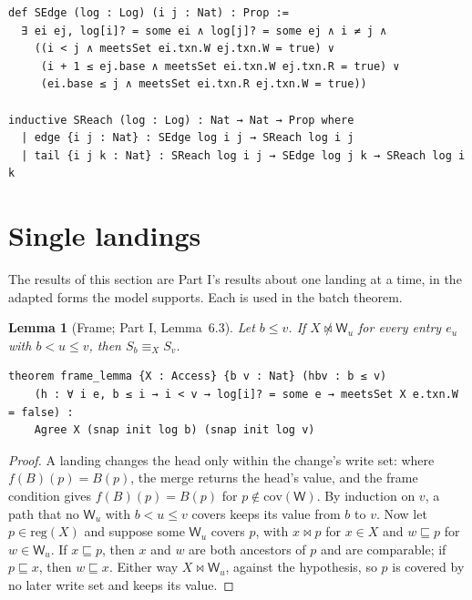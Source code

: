 \documentclass[11pt,letterpaper]{article}
\newtheorem{lemma}[theorem]{Lemma}
\theoremstyle{definition}
\theoremstyle{remark}
\newcommand{\W}{\mathsf{W}}
\newcommand{\Snap}[1]{S_{#1}}
\newcommand{\meets}{\bowtie}
\newcommand{\nmeets}{\not\bowtie}
\newcommand{\cov}{\sqsubseteq}
\newcommand{\op}[1]{\mathrm{#1}}
\newcommand{\covd}{\op{cov}}
\newcommand{\reg}{\op{reg}}
\begin{document}
\begin{lstlisting}[language=Lean,caption={The declared-access serialization graph (\texttt{YonedaTx/Graph.lean})},label={lst:mcbl:sedge}]
def SEdge (log : Log) (i j : Nat) : Prop :=
  ∃ ei ej, log[i]? = some ei ∧ log[j]? = some ej ∧ i ≠ j ∧
    ((i < j ∧ meetsSet ei.txn.W ej.txn.W = true) ∨
     (i + 1 ≤ ej.base ∧ meetsSet ei.txn.W ej.txn.R = true) ∨
     (ei.base ≤ j ∧ meetsSet ei.txn.R ej.txn.W = true))

inductive SReach (log : Log) : Nat → Nat → Prop where
  | edge {i j : Nat} : SEdge log i j → SReach log i j
  | tail {i j k : Nat} : SReach log i j → SEdge log j k → SReach log i k
\end{lstlisting}

\section{Single landings}
\label{sec:mcbl:single}

The results of this section are Part I's results about one landing at a time, in the adapted forms the model supports. Each is used in the batch theorem.

\begin{lemma}[Frame; Part I, Lemma~6.3]
\label{lem:mcbl:frame}
Let $b\leq v$. If $X\nmeets\W_u$ for every entry $e_u$ with $b<u\leq v$, then $\Snap{b}\equiv_X\Snap{v}$.
\end{lemma}

\begin{lstlisting}[language=Lean,caption={The frame lemma (\texttt{YonedaTx/Log.lean})},label={lst:mcbl:frame}]
theorem frame_lemma {X : Access} {b v : Nat} (hbv : b ≤ v)
    (h : ∀ i e, b ≤ i → i < v → log[i]? = some e → meetsSet X e.txn.W = false) :
    Agree X (snap init log b) (snap init log v)
\end{lstlisting}

\begin{proof}
A landing changes the head only within the change's write set: where $f(B)(p)=B(p)$, the merge returns the head's value, and the frame condition gives $f(B)(p)=B(p)$ for $p\notin\covd(\W)$. By induction on $v$, a path that no $\W_u$ with $b<u\leq v$ covers keeps its value from $b$ to $v$. Now let $p\in\reg(X)$ and suppose some $\W_u$ covers $p$, with $x\meets p$ for $x\in X$ and $w\cov p$ for $w\in\W_u$. If $x\cov p$, then $x$ and $w$ are both ancestors of $p$ and are comparable; if $p\cov x$, then $w\cov x$. Either way $X\meets\W_u$, against the hypothesis, so $p$ is covered by no later write set and keeps its value.
\end{proof}
\end{document}

